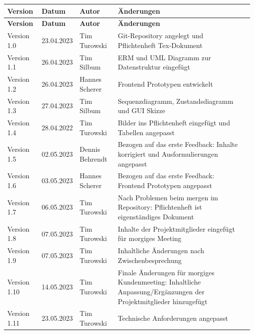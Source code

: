 \begin{flushleft}
		\begin{longtable}{p{}p{2cm}p{3cm}p{}c}
            \toprule
            \textbf{Version} & \textbf{Datum} & \textbf{Autor} & \textbf{Änderungen}\\
            \midrule\endfirsthead
            \toprule
            \textbf{Version} & \textbf{Datum} & \textbf{Autor} & \textbf{Änderungen}\\
            \midrule\endhead
            	Version 1.0 & 23.04.2023 & Tim Turowski & Git-Repository angelegt und Pflichtenheft Tex-Dokument \\ \midrule
				Version 1.1 & 26.04.2023 & Tim Silbum & ERM und UML Diagramm zur Datenstruktur eingefügt \\ \midrule
				Version 1.2 & 26.04.2023 & Hannes Scherer & Frontend Prototypen entwickelt \\ \midrule
				Version 1.3 & 27.04.2023 & Tim Silbum & Sequenzdiagramm, Zustandsdiagramm und GUI Skizze \\ \midrule
 				Version 1.4 & 28.04.2022 & Tim Turowski & Bilder ins Pflichtenheft eingefügt und Tabellen angepasst \\ \midrule
				Version 1.5 & 02.05.2023 & Dennis Behrendt & Bezogen auf das erste Feedback: Inhalte korrigiert und Ausformulierungen angepasst \\ \midrule
				Version 1.6 & 03.05.2023 & Hannes Scherer & Bezogen auf das erste Feedback: Frontend Prototypen angepasst \\ \midrule
				Version 1.7 & 06.05.2023 & Tim Turowski & Nach Problemen beim mergen im Repository: Pflichtenheft ist eigenständiges Dokument \\ \midrule
				Version 1.8 & 07.05.2023 & Tim Turowski & Inhalte der Projektmitglieder eingefügt für morgiges Meeting \\ \midrule
				Version 1.9 & 07.05.2023 & Tim Turowski & Inhaltliche Änderungen nach Zwischenbesprechung \\ \midrule
				Version 1.10 & 14.05.2023 & Tim Turowski & Finale Änderungen für morgiges Kundenmeeting: Inhaltliche Anpassung/Ergänzungen der Projektmitglieder hinzugefügt \\  \midrule
				Version 1.11 & 23.05.2023 & Tim Turowski & Technische Anforderungen angepasst \\ 
            \bottomrule
    \end{longtable}

\end{flushleft}

